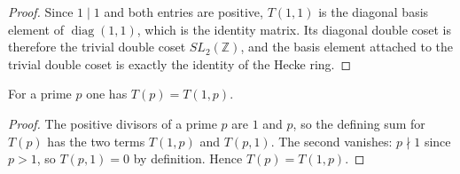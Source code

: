 \begin{proof}
\leanok
Since $1\mid 1$ and both entries are positive, $T(1,1)$ is the diagonal basis element of
$\operatorname{diag}(1,1)$, which is the identity matrix. Its diagonal double coset is
therefore the trivial double coset $SL_2(\mathbb{Z})$, and the basis element attached to the
trivial double coset is exactly the identity of the Hecke ring.
\end{proof}

\begin{lemma}[$T(p)$ at a prime]\label{lem:T-sum-prime}
\leanok
For a prime $p$ one has $T(p)=T(1,p)$.
\end{lemma}

\begin{proof}
\leanok
The positive divisors of a prime $p$ are $1$ and $p$, so the defining sum for $T(p)$ has the
two terms $T(1,p)$ and $T(p,1)$. The second vanishes: $p\nmid 1$ since $p>1$, so $T(p,1)=0$
by definition. Hence $T(p)=T(1,p)$.
\end{proof}
